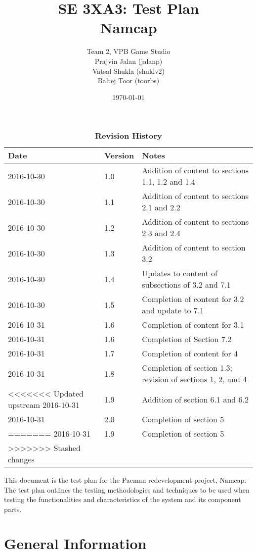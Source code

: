 \documentclass[12pt, titlepage]{article}
\title{SE 3XA3: Test Plan\\Namcap}
\author{Team 2, VPB Game Studio
		\\ Prajvin Jalan (jalanp)
		\\ Vatsal Shukla (shuklv2)
		\\ Baltej Toor (toorbs)
}
\date{\today}
\begin{document}
\maketitle

\tableofcontents
\listoftables
\listoffigures

\begin{table}[h]
\caption{\bf Revision History}
\begin{tabularx}{\textwidth}{p{3cm}p{2cm}X}
\toprule {\bf Date} & {\bf Version} & {\bf Notes}\\
\midrule
2016-10-30 & 1.0 & Addition of content to sections 1.1, 1.2 and 1.4\\
2016-10-30 & 1.1 & Addition of content to sections 2.1 and 2.2\\
2016-10-30 & 1.2 & Addition of content to sections 2.3 and 2.4\\
2016-10-30 & 1.3 & Addition of content to section 3.2\\
2016-10-30 & 1.4 & Updates to content of subsections of 3.2 and 7.1\\
2016-10-30 & 1.5 & Completion of content for 3.2 and update to 7.1\\
2016-10-31 & 1.6 & Completion of content for 3.1\\
2016-10-31 & 1.6 & Completion of Section 7.2\\
2016-10-31 & 1.7 & Completion of content for 4\\
2016-10-31 & 1.8 & Completion of section 1.3; revision of sections 1, 2, and 4\\
<<<<<<< Updated upstream
2016-10-31 & 1.9 & Addition of section 6.1 and 6.2\\
2016-10-31 & 2.0 & Completion of section 5\\
=======
2016-10-31 & 1.9 & Completion of section 5\\
>>>>>>> Stashed changes
\bottomrule
\end{tabularx}
\end{table}

\newpage


This document is the test plan for the Pacman redevelopment project, Namcap. The test plan outlines the testing methodologies and techniques to be used when testing the functionalities and characteristics of the system and its component parts.

\section{General Information}
\end{document}
